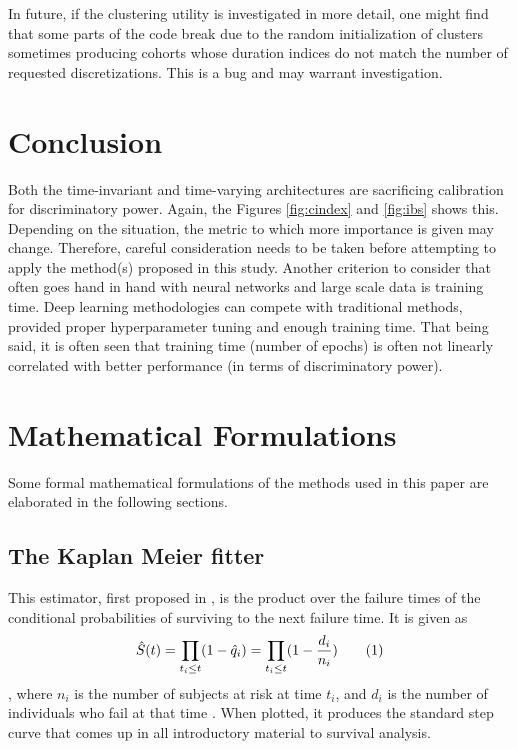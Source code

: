 \documentclass[%
 twocolumn,
 reprint,
 amsmath,amssymb,
 aps,nofootinbib
]{revtex4-2}
\newcommand\numberthis{\addtocounter{equation}{1}\tag{\theequation}} %
\begin{document}
In future, if the clustering utility is investigated in more detail, one might find that some parts of the code break due to the random initialization of clusters sometimes producing cohorts whose duration indices do not match the number of requested discretizations. This is a bug and may warrant investigation. 

\section{\label{conc}Conclusion}
Both the time-invariant and time-varying architectures are sacrificing calibration for discriminatory power. Again, the Figures \ref{fig:cindex} and \ref{fig:ibs} shows this. Depending on the situation, the metric to which more importance is given may change. Therefore, careful consideration needs to be taken before attempting to apply the method(s) proposed in this study. Another criterion to consider that often goes hand in hand with neural networks and large scale data is training time. Deep learning methodologies can compete with traditional methods, provided proper hyperparameter tuning and enough training time. That being said, it is often seen that training time (number of epochs) is often not linearly correlated with better performance (in terms of discriminatory power).



\appendix

\section{\label{appdx}Mathematical Formulations}

Some formal mathematical formulations of the methods used in this paper are elaborated in the following sections.

\subsection{\label{app:non_param}The Kaplan Meier fitter}

This estimator, first proposed in \cite{km_curve}, is the product over the failure times of the conditional probabilities of surviving to the next failure time. It is given as
\[
\hat{S}(t) = \prod_{t_i \le t}(1 - \hat{q}_i) = \prod_{t_i \le t}(1 - \frac{d_i}{n_i}) \numberthis  \label{eq:km}
\],
where $n_i$ is the number of subjects at risk at time $t_i$, and $d_i$ is the number of individuals who fail at that time \cite{Moore_2016}. When plotted, it produces the standard step curve that comes up in all introductory material to survival analysis.
\end{document}
